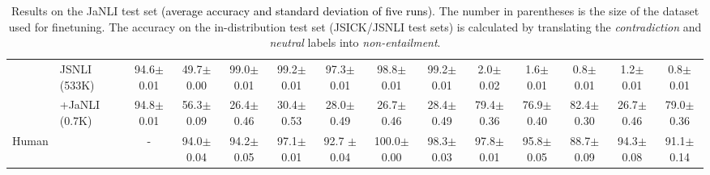 \documentclass[11pt]{article}
\newcommand{\todo}[1]{\textcolor{black}{#1}}
\begin{document}
\begin{table*}[h!]
{\begin{tabular}{ll|c|c|ccccc|ccccc}
 & JSNLI (533K) & 94.6{\small $\pm$0.01}
 &49.7{\small $\pm$0.00}
 & 99.0{\small $\pm$0.01} & 99.2{\small $\pm$0.01} & 97.3{\small $\pm$0.01} & 98.8{\small $\pm$0.01} & 99.2{\small $\pm$0.01} & 2.0{\small $\pm$0.02} & 1.6{\small $\pm$0.01} & 0.8{\small $\pm$0.01} & 1.2{\small $\pm$0.01} & 0.8{\small $\pm$0.01}\\
 & +JaNLI (0.7K) & 94.8{\small $\pm$0.01} 
 &56.3{\small $\pm$0.09}
 &26.4{\small $\pm$0.46} & 30.4{\small $\pm$0.53} & 28.0{\small $\pm$0.49} & 26.7{\small $\pm$0.46} & 28.4{\small $\pm$0.49} & 79.4{\small $\pm$0.36} & 76.9{\small $\pm$0.40} & 82.4{\small $\pm$0.30} & 26.7{\small $\pm$0.46} & 79.0{\small $\pm$0.36}\\
\hline
Human &  & - & 94.0{\small $\pm$0.04} & 94.2{\small $\pm$0.05} & 97.1{\small $\pm$0.01} & 92.7 {\small $\pm$0.04} & 100.0{\small $\pm$0.00} & 98.3{\small $\pm$0.03} & 97.8{\small $\pm$0.01} & 95.8{\small $\pm$0.05} & 88.7{\small $\pm$0.09} & 94.3{\small $\pm$0.08} & 91.1{\small $\pm$0.14}\\ \hline
\end{tabular}
}
\caption{Results on the JaNLI test set \todo{(average accuracy and standard deviation of five runs)}. The number in parentheses is the size of the dataset used for finetuning. The accuracy on the in-distribution test set (JSICK/JSNLI test sets) is calculated by translating the \textit{contradiction} and \textit{neutral} labels into \textit{non-entailment}.} 
\label{tab:results}
\end{table*}
\end{document}
